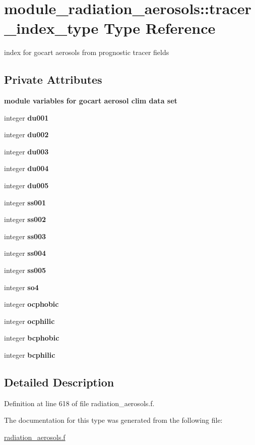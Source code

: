 \hypertarget{structmodule__radiation__aerosols_1_1tracer__index__type}{}\section{module\+\_\+radiation\+\_\+aerosols\+:\+:tracer\+\_\+index\+\_\+type Type Reference}
\label{structmodule__radiation__aerosols_1_1tracer__index__type}


index for gocart aerosols from prognostic tracer fields  


\subsection*{Private Attributes}
\begin{Indent}\textbf{ module variables for gocart aerosol clim data set}\par
\begin{DoxyCompactItemize}
\item 
integer {\bfseries du001}
\item 
integer {\bfseries du002}
\item 
integer {\bfseries du003}
\item 
integer {\bfseries du004}
\item 
integer {\bfseries du005}
\item 
integer {\bfseries ss001}
\item 
integer {\bfseries ss002}
\item 
integer {\bfseries ss003}
\item 
integer {\bfseries ss004}
\item 
integer {\bfseries ss005}
\item 
integer {\bfseries so4}
\item 
integer {\bfseries ocphobic}
\item 
integer {\bfseries ocphilic}
\item 
integer {\bfseries bcphobic}
\item 
integer {\bfseries bcphilic}
\end{DoxyCompactItemize}
\end{Indent}


\subsection{Detailed Description}


Definition at line 618 of file radiation\+\_\+aerosols.\+f.



The documentation for this type was generated from the following file\+:\begin{DoxyCompactItemize}
\item 
\hyperlink{radiation__aerosols_8f}{radiation\+\_\+aerosols.\+f}\end{DoxyCompactItemize}
